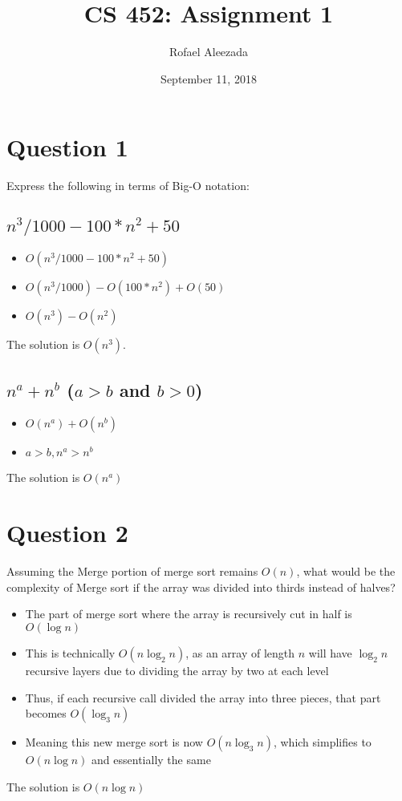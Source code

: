 \documentclass{report}
\title{CS 452: Assignment 1}
\date{September 11, 2018}
\author{Rofael Aleezada}
\begin{document}
    \maketitle

    \section{Question 1}
    Express the following in terms of Big-O notation:
        \subsection{$n^3/1000 - 100 * n^2 + 50$}
        	\begin{itemize}
        		\item{$O(n^3 / 1000 - 100 * n^2 + 50)$}
        		\item{$O(n^3 / 1000) - O(100*n^2) + O(50)$}
        		\item{$O(n^3) - O(n^2)$}
        	\end{itemize}
            The solution is $O(n^3)$.

        \subsection{$n^a + n^b$ ($a > b$ and $b > 0$)}
        	\begin{itemize}
        		\item{$O(n^a) + O(n^b)$}
        		\item{$a > b, n^a > n^b$}
        	\end{itemize}
            The solution is $O(n^a)$

    \section{Question 2}
    Assuming the Merge portion of merge sort remains $O(n)$, what would be the complexity of Merge sort if the array was divided into thirds instead of halves?
        \begin{itemize}
            \item{The part of merge sort where the array is recursively cut in half is $O(\log n)$}
            \item{This is technically $O(n\log_2 n)$, as an array of length $n$ will have $\log_2 n$ recursive layers due to dividing the array by two at each level}
            \item{Thus, if each recursive call divided the array into three pieces, that part becomes $O(\log_3 n)$}
            \item{Meaning this new merge sort is now $O(n\log_3 n)$, which simplifies to $O(n\log n)$ and essentially the same}
        \end{itemize}
        The solution is $O(n\log n)$
\end{document}
